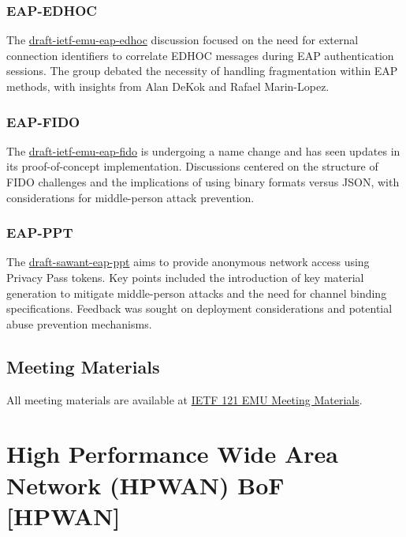 \documentclass{article}
\begin{document}
\subsubsection{EAP-EDHOC}

The \href{https://datatracker.ietf.org/doc/html/draft-ietf-emu-eap-edhoc}{draft-ietf-emu-eap-edhoc} discussion focused on the need for external connection identifiers to correlate EDHOC messages during EAP authentication sessions. The group debated the necessity of handling fragmentation within EAP methods, with insights from Alan DeKok and Rafael Marin-Lopez.

\subsubsection{EAP-FIDO}

The \href{https://datatracker.ietf.org/doc/html/draft-ietf-emu-eap-fido}{draft-ietf-emu-eap-fido} is undergoing a name change and has seen updates in its proof-of-concept implementation. Discussions centered on the structure of FIDO challenges and the implications of using binary formats versus JSON, with considerations for middle-person attack prevention.

\subsubsection{EAP-PPT}

The \href{https://datatracker.ietf.org/doc/html/draft-sawant-eap-ppt}{draft-sawant-eap-ppt} aims to provide anonymous network access using Privacy Pass tokens. Key points included the introduction of key material generation to mitigate middle-person attacks and the need for channel binding specifications. Feedback was sought on deployment considerations and potential abuse prevention mechanisms.

\subsection{Meeting Materials}

All meeting materials are available at \href{https://datatracker.ietf.org/meeting/121/materials/agenda-121-emu}{IETF 121 EMU Meeting Materials}.






\newpage

\section{High Performance Wide Area Network (HPWAN) BoF [HPWAN]}
\end{document}

